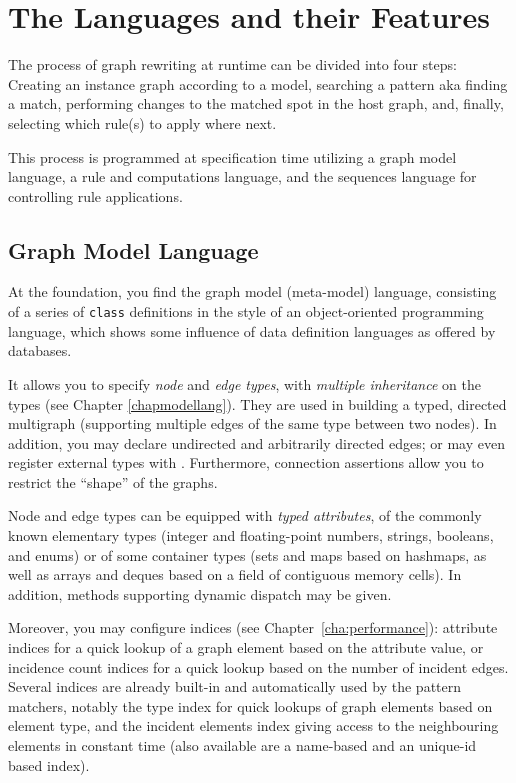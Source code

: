 \section{The Languages and their Features}

The process of graph rewriting at runtime can be divided into four steps:
Creating an instance graph according to a model,
searching a pattern aka finding a match,
performing changes to the matched spot in the host graph,
and, finally, selecting which rule(s) to apply where next.

This process is programmed at specification time utilizing a graph model language, a rule and computations language, and the sequences language for controlling rule applications.

\subsection{Graph Model Language}
At the foundation, you find the graph model (meta-model) language, consisting of a series of \texttt{class} definitions in the style of an object-oriented programming language, which shows some influence of data definition languages as offered by databases. 

It allows you to specify \emph{node} and \emph{edge types}, with \emph{multiple inheritance} on the types (see Chapter \ref{chapmodellang}).
They are used in building a typed, directed multigraph (supporting multiple edges of the same type between two nodes).
In addition, you may declare undirected and arbitrarily directed edges; or may even register external types with \GrG.
Furthermore, connection assertions allow you to restrict the ``shape'' of the graphs.

Node and edge types can be equipped with \emph{typed attributes}, of the commonly known elementary types (integer and floating-point numbers, strings, booleans, and enums) or of some container types (sets and maps based on hashmaps, as well as arrays and deques based on a field of contiguous memory cells).
In addition, methods supporting dynamic dispatch may be given.%

Moreover, you may configure indices (see Chapter~\ref{cha:performance}): attribute indices for a quick lookup of a graph element based on the attribute value, or incidence count indices for a quick lookup based on the number of incident edges.
Several indices are already built-in and automatically used by the pattern matchers, notably the type index for quick lookups of graph elements based on element type, and the incident elements index giving access to the neighbouring elements in constant time (also available are a name-based and an unique-id based index).

